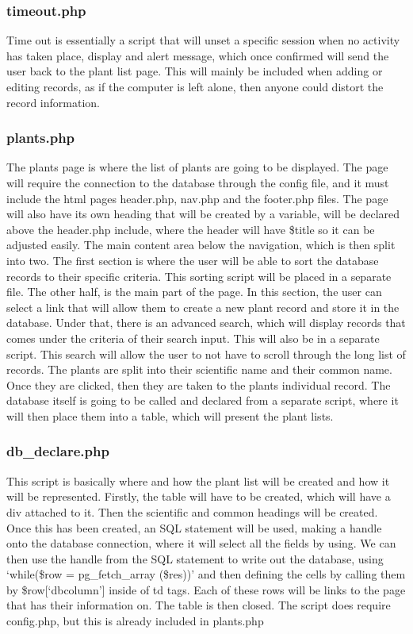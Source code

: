 	\subsubsection{timeout.php}
		Time out is essentially a script that will unset a specific session when no activity has taken place, display and alert message, which once confirmed will send the user back to the plant list page. This will mainly be included when adding or editing records, as if the computer is left alone, then anyone could distort the record information.

	\subsubsection{plants.php}
		The plants page is where the list of plants are going to be displayed. The page will require the connection to the database through the config file, and it must include the html pages header.php, nav.php and the footer.php files.  The page will also have its own heading that will be created by a variable, will be declared above the header.php include, where the header will have \$title so it can be adjusted easily. The main content area below the navigation, which is then split into two. The first section is where the user will be able to sort the database records to their specific criteria. This sorting script will be placed in a separate file. The other half, is the main part of the page. In this section, the user can select a link that will allow them to create a new plant record and store it in the database. Under that, there is an advanced search, which will display records that comes under the criteria of their search input. This will also be in a separate script. This search will allow the user to not have to scroll through the long list of records. The plants are split into their scientific name and their common name. Once they are clicked, then they are taken to the plants individual record. The database itself is going to be called and declared from a separate script, where it will then place them into a table, which will present the plant lists.

\subsubsection{db\_declare.php}
This script is basically where and how the plant list will be created and how it will be represented. Firstly, the table will have to be created, which will have a div attached to it. Then the scientific and common headings will be created. Once this has been created, an SQL statement will be used, making a handle onto the database connection, where it will select all the fields by using.  We can then use the handle from the SQL statement to write out the database, using `while(\$row = pg\_fetch\_array (\$res))' and then defining the cells by calling them by \$row[`dbcolumn'] inside of td tags.  Each of these rows will be links to the page that has their information on. The table is then closed. The script does require config.php, but this is already included in plants.php

